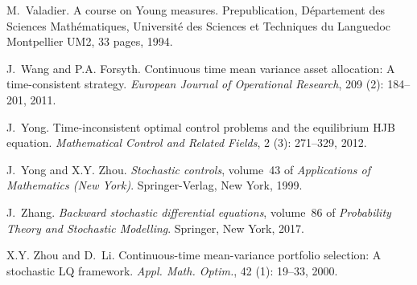 \documentclass[12pt]{article}
\theoremstyle{named}
\numberwithin{equation}{section}
\begin{document}
\begin{thebibliography}{31}
M.~Valadier.
\newblock A course on {Y}oung measures.
\newblock Prepublication, D\'epartement des Sciences Math\'ematiques,
  Universit\'e des Sciences et Techniques du Languedoc Montpellier UM2, 33
  pages, 1994.

J.~Wang and P.A. Forsyth.
\newblock Continuous time mean variance asset allocation: A time-consistent
  strategy.
\newblock \emph{European Journal of Operational Research}, 209
  (2): 184--201, 2011.

J.~Yong.
\newblock Time-inconsistent optimal control problems and the equilibrium {HJB}
  equation.
\newblock \emph{Mathematical Control and Related Fields}, 2
  (3): 271--329, 2012.

J.~Yong and X.Y. Zhou.
\newblock \emph{Stochastic controls}, volume~43 of \emph{Applications of
  Mathematics (New York)}.
\newblock Springer-Verlag, New York, 1999.

J.~Zhang.
\newblock \emph{Backward stochastic differential equations}, volume~86 of
  \emph{Probability Theory and Stochastic Modelling}.
\newblock Springer, New York, 2017.

X.Y. Zhou and D.~Li.
\newblock Continuous-time mean-variance portfolio selection: A stochastic {LQ}
  framework.
\newblock \emph{Appl. Math. Optim.}, 42 (1): 19--33, 2000.

\end{thebibliography}
\end{document}
